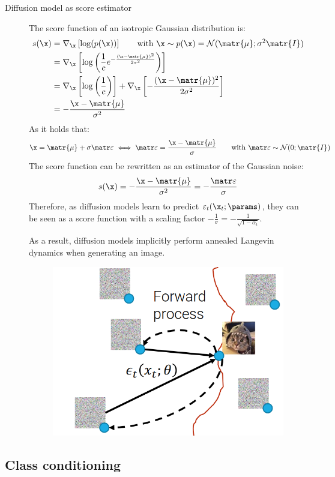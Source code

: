 \begin{description}
    \item[Diffusion model as score estimator]
        The score function of an isotropic Gaussian distribution is:
        \[ 
            \begin{split}
                s(\x) &= \nabla_\x\left[ \log(p(\x)) \right] \qquad \text{with } \x \sim p(\x) = \mathcal{N}(\matr{\mu}; \sigma^2\matr{I}) \\
                &= \nabla_\x\left[ \log\left( \frac{1}{c} e^{-\frac{(\x-\matr{\mu})^2}{2\sigma^2}} \right) \right] \\
                &= \nabla_\x\left[ \log\left(\frac{1}{c}\right) \right] + \nabla_\x\left[ -\frac{(\x - \matr{\mu})^2}{2\sigma^2} \right] \\
                &= -\frac{\x - \matr{\mu}}{\sigma^2}
            \end{split}
        \]
        As it holds that:
        \[ \x = \matr{\mu} + \sigma\noise \iff \noise = \frac{\x - \matr{\mu}}{\sigma} \qquad \text{with } \noise \sim \mathcal{N}(0; \matr{I}) \]
        The score function can be rewritten as an estimator of the Gaussian noise:
        \[ s(\x) = -\frac{\x - \matr{\mu}}{\sigma^2} = -\frac{\noise}{\sigma} \]
        Therefore, as diffusion models learn to predict $\varepsilon_t(\x_t; \params)$, they can be seen as a score function with a scaling factor $-\frac{1}{\sigma} = -\frac{1}{\sqrt{1-\alpha_t}}$.

        As a result, diffusion models implicitly perform annealed Langevin dynamics when generating an image.

        \begin{figure}[H]
            \centering
            \includegraphics[width=0.3\linewidth]{./img/diffusion_model_annealing.png}
        \end{figure}
\end{description}


\subsection{Class conditioning}

